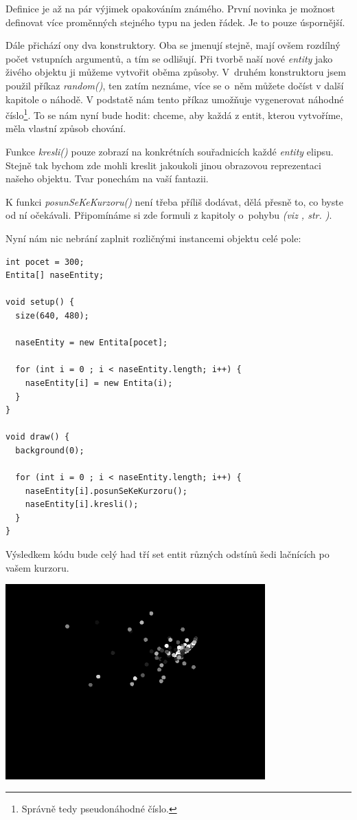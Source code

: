 \documentclass[10pt,twoside=true,open=right,cleardoublepage=empty,chapterprefix=true]{scrbook}
\newcommand{\poznamka}[1]{\footnote{\/ #1}}
\newcommand{\vyraz}[1]{\textit{\gls{#1}}\index{#1}\label{#1}}
\newcommand{\odkaz}[1]{\textit{(viz \nameref{#1}, str. \pageref*{#1})}}
\newcommand{\lnb}{\linebreak}
\begin{document}
Definice je až na pár výjimek opakováním známého. První novinka je možnost definovat více proměnných stejného typu na jeden řádek. Je to pouze úspornější.

 Dále přichází ony dva konstruktory. Oba se jmenují stejně, mají ovšem rozdílný počet vstupních argumentů, a tím se odlišují. Při tvorbě naší nové {\em entity} jako živého objektu ji můžeme vytvořit oběma způsoby. V~druhém konstruktoru jsem použil příkaz \vyraz{random()}, ten zatím neznáme, více se \lnb o~něm můžete dočíst v další kapitole o náhodě. V podstatě nám tento příkaz umožňuje vygenerovat náhodné číslo\poznamka{Správně tedy pseudonáhodné číslo.}. To se nám nyní bude hodit: chceme, aby každá z entit, kterou vytvoříme, měla vlastní způsob chování.
 
Funkce {\em kresli()} pouze zobrazí na konkrétních souřadnicích každé {\em entity} elipsu. Stejně tak bychom zde mohli kreslit jakoukoli jinou obrazovou reprezentaci našeho objektu. Tvar ponechám na vaší fantazii.
 
K funkci {\em posunSeKeKurzoru()} není třeba příliš dodávat, dělá přesně to, co byste od ní očekávali. Připomínáme si zde formuli z kapitoly \lnb o~pohy\-bu \odkaz{Dynamika pohybu}.

\pagebreak

Nyní nám nic nebrání zaplnit rozličnými instancemi objektu celé pole:


\begin{lstlisting}
int pocet = 300;
Entita[] naseEntity;

void setup() {
  size(640, 480);

  naseEntity = new Entita[pocet]; 

  for (int i = 0 ; i < naseEntity.length; i++) {
    naseEntity[i] = new Entita(i);
  }
}

void draw() {
  background(0);

  for (int i = 0 ; i < naseEntity.length; i++) {
    naseEntity[i].posunSeKeKurzoru();
    naseEntity[i].kresli();
  }
}
\end{lstlisting}

Výsledkem kódu bude celý had tří set entit různých odstínů šedi lačnících po vašem kurzoru.


\begin{center}
\includegraphics[width = 0.75\textwidth]{imgs/prace-s-objekty-1.png}
\end{center}
\end{document}
